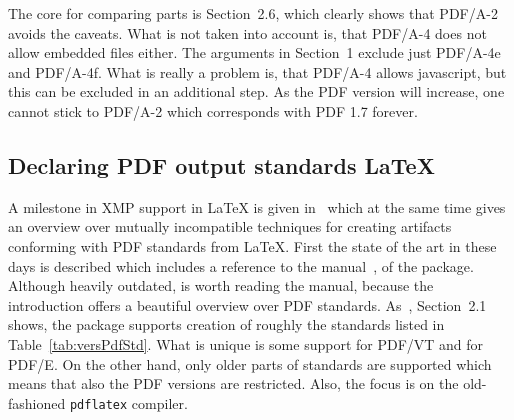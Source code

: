 The core for comparing parts is Section~2.6, which clearly shows that PDF/A-2 avoids the caveats. 
What is not taken into account is, that PDF/A-4 does not allow embedded files either. 
The arguments in Section~1 exclude just PDF/A-4e and PDF/A-4f. 
What is really a problem is, that PDF/A-4 allows javascript, but this can be excluded in an additional step. 
As the PDF version will increase, one cannot stick to PDF/A-2 which corresponds with PDF 1.7 forever. 












\subsection{Declaring PDF output standards \LaTeX}\label{subsec:stdDecl}


A milestone in XMP support in \LaTeX{} is given in~\cite{XMPlatex} 
which at the same time gives an overview over mutually incompatible techniques for creating artifacts conforming with PDF standards from \LaTeX{}. 
First the state of the art in these days is described which includes a reference to the manual~\cite{PdfxP}, of the  package. 
Although heavily outdated, is worth reading the manual, because the introduction offers a beautiful overview over PDF standards. 
As~\cite{PdfxP}, Section~2.1 shows, the package  supports creation of roughly the standards 
listed in Table~\ref{tab:versPdfStd}. 
What is unique is some support for PDF/VT and for PDF/E. 
On the other hand, only older parts of standards are supported which means that also the PDF versions are restricted. 
Also, the focus is on the old-fashioned \texttt{pdflatex} compiler. 

